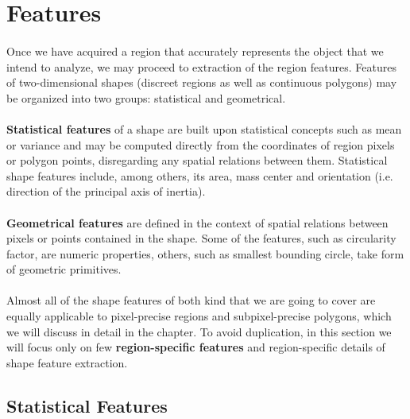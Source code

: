 \section{Features}

\paragraph*{}
Once we have acquired a region that accurately represents the object that we intend to analyze, we may proceed to extraction of the region features. Features of two-dimensional shapes (discreet regions as well as continuous polygons) may be organized into two groups: statistical and geometrical.

\paragraph*{}
\textbf{Statistical features} of a shape are built upon statistical concepts such as mean or variance and may be computed directly from the coordinates of region pixels or polygon points, disregarding any spatial relations between them. Statistical shape features include, among others, its area, mass center and orientation (i.e. direction of the principal axis of inertia).

\paragraph*{}
\textbf{Geometrical features} are defined in the context of spatial relations between pixels or points contained in the shape. Some of the features, such as circularity factor, are numeric properties, others, such as smallest bounding circle, take form of geometric primitives.

\paragraph*{}
Almost all of the shape features of both kind that we are going to cover are equally applicable to pixel-precise regions and subpixel-precise polygons, which we will discuss in detail in the  chapter. To avoid duplication, in this section we will focus only on few \textbf{region-specific features} and region-specific details of shape feature extraction.

\subsection{Statistical Features}

